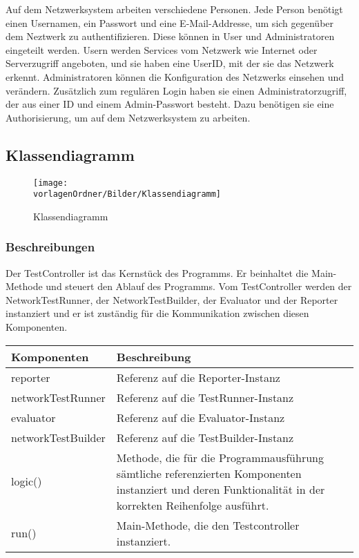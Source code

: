 \documentclass[]{subfiles}
\begin{document}
	Auf dem Netzwerksystem arbeiten verschiedene Personen. 
	Jede Person benötigt einen Usernamen, ein Passwort und eine E-Mail-Addresse, um sich gegenüber dem Neztwerk zu authentifizieren.
	Diese können in User und Administratoren eingeteilt werden. 
	Usern werden Services vom Netzwerk wie Internet oder Serverzugriff angeboten, und sie haben eine UserID, mit der sie das Netzwerk erkennt.
	Administratoren können die Konfiguration des Netzwerks einsehen und verändern. 
	Zusätzlich zum regulären Login haben sie einen Administratorzugriff, der aus einer ID und einem Admin-Passwort besteht.
	Dazu benötigen sie eine Authorisierung, um auf dem Netzwerksystem zu arbeiten.

\begin{landscape}
	\subsection{Klassendiagramm}
	\begin{figure}[h!]
			\texttt{[image: \\vorlagenOrdner/Bilder/Klassendiagramm]}
			\caption{Klassendiagramm}
	\end{figure}
	\newpage	
\end{landscape}


	\subsubsection{Beschreibungen}

	Der TestController ist das Kernstück des Programms. 
	Er beinhaltet die Main-Methode und steuert den Ablauf des Programms. 
	Vom TestController werden der NetworkTestRunner, der NetworkTestBuilder, der Evaluator 
	und der Reporter instanziert und er ist zuständig für die Kommunikation 
	zwischen diesen Komponenten.
	
	\begin{tabularx}{\textwidth}{lX}
		\toprule
			Komponenten & Beschreibung \\
		\midrule
			reporter & Referenz auf die Reporter-Instanz \\
			networkTestRunner & Referenz auf die TestRunner-Instanz \\
			evaluator & Referenz auf die Evaluator-Instanz \\
			networkTestBuilder & Referenz auf die TestBuilder-Instanz \\
		\midrule
			logic() & Methode, die für die Programmausführung sämtliche referenzierten Komponenten instanziert und deren Funktionalität in der korrekten Reihenfolge ausführt.\\
			run() & Main-Methode, die den Testcontroller instanziert. \\
		\bottomrule
	\end{tabularx}
\end{document}
